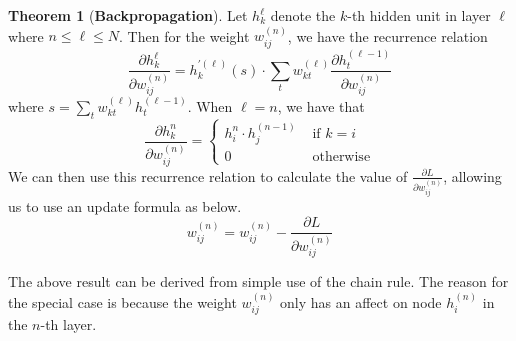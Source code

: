 \documentclass[12pt,letterpaper]{book}
\theoremstyle{definition}
\newtheorem{theorem}{Theorem}[section]
\begin{document}
    \begin{theorem}[\textbf{Backpropagation}]
      Let $h_{k}^{\ell}$ denote the $k$-th hidden unit in layer $\ell$ where $n \le \ell \le N$.
      Then for the weight $w^{(n)}_{ij}$, we have the recurrence relation 
      \[
        \frac{\partial h_k^{\ell}}{\partial w^{(n)}_{ij}}
        =
        h_k^{\prime(\ell)}(s)
        \cdot
        \sum_{t}w_{kt}^{(\ell)}\frac{\partial h^{(\ell-1)}_t}{\partial w^{(n)}_{ij}} 
      \]
      where $s =\sum_{t}w^{(\ell)}_{kt}h^{(\ell-1)}_t$.
      When
      $\ell = n$, we have that
      \[
        \frac{\partial h_k^{n}}{\partial w^{(n)}_{ij}} = 
        \begin{cases}
          h_i^n \cdot h_j^{(n -1)} & \text{ if } k = i\\
          0 & \text{ otherwise}
        \end{cases}
      \]
      We can then use this recurrence relation to calculate the value of 
      $\frac{\partial L}{\partial w^{(n)}_{ij}}$, allowing us to use an update formula as below.
      \[
        w^{(n)}_{ij} = w^{(n)}_{ij} - \frac{\partial L}{\partial w^{(n)}_{ij}}
      \]
    \end{theorem}

    The above result can be derived from simple use of the chain rule. The reason
    for the special case is because the weight $w_{ij}^{(n)}$
    only has an affect on node $h_i^{(n)}$ in the $n$-th layer.
\end{document}
